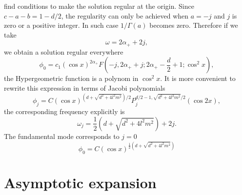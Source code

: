 \documentclass[a4paper,12pt]{article}
\begin{document}
find conditions to make the solution regular at the origin. Since $c - a - b = 1 - d/2$, the regularity can only be achieved when $a = - j$ and $j$ is zero or a positive integer. In such case $1/\Gamma(a)$ becomes zero. Therefore if we take
\begin{equation}
	\omega = 2\alpha_+ + 2j,
\end{equation}
we obtain a solution regular everywhere
\begin{equation}
	\phi_0 = c_1 (\cos x)^{2\alpha_+} F\left(-j, 2\alpha_+ + j; 2\alpha_+ -\frac{d}{2}+1; \cos^2 x\right),
\end{equation}
the Hypergeometric function is a polynom in $\cos^2 x$. It is more convenient to rewrite this expression in terms of Jacobi polynomials
\begin{equation}
	\phi_j = C (\cos x)^{(d + \sqrt{d^2 + 4 l^2 m^2})/2} P^{d/2 - 1, \sqrt{d^2 + 4 l^2 m^2}/2}_j(\cos 2x),
\end{equation}
the corresponding frequency explicitly is
\begin{equation}
	\omega_j = \frac{1}{2}(d + \sqrt{d^2 + 4 l^2 m^2}) + 2j.
\end{equation}
The fundamental mode corresponds to $j = 0$
\begin{equation}
	\phi_0 = C (\cos x)^{\frac{1}{2}(d + \sqrt{d^2 + 4 l^2 m^2})}
\end{equation}

\section{Asymptotic expansion}
\end{document}
